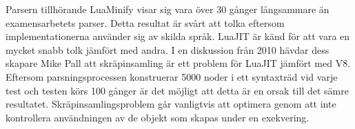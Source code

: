 Parsern tillhörande LuaMinify visar sig vara över 30 gånger långsammare än
examensarbetets parser. Detta resultat är svårt att tolka eftersom
implementationerna använder sig av skilda språk. LuaJIT är känd för att vara
en mycket snabb tolk jämfört med andra. I en diskussion från 2010 hävdar dess
skapare Mike Pall \citep{mp10} att skräpinsamling är ett problem för LuaJIT
jämfört med V8. Eftersom parsningsprocessen konstruerar 5000 noder i ett
syntaxträd vid varje test och testen körs 100 gånger är det möjligt att detta
är en orsak till det sämre resultatet. Skräpinsamlingsproblem går vanligtvis
att optimera genom att inte kontrollera användningen av de objekt som skapas
under en exekvering.

